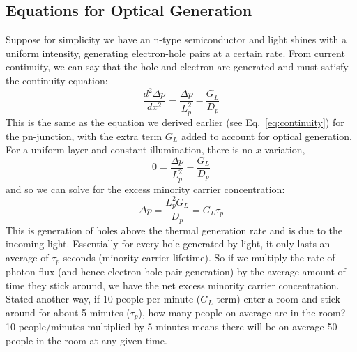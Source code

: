 \subsection{Equations for Optical Generation}
Suppose for simplicity we have an n-type semiconductor and light shines with a uniform intensity, generating electron-hole pairs at a certain rate.   From current continuity, we can say that the hole and electron are generated and must satisfy the continuity equation:
    \begin{equation} 
        \frac{d^2 \Delta p}{dx^2}   = \frac{\Delta p}{L_p^2} - \frac{G_L}{D_p}
    \end{equation}
This is the same as the equation we derived earlier (see Eq.~\ref{eq:continuity}) for the pn-junction, with the extra term $G_L$ added to account for optical generation.   For a uniform layer and constant illumination, there is no $x$ variation, 
    \begin{equation} 
        0  = \frac{\Delta p}{L_p^2} - \frac{G_L}{D_p}
    \end{equation}
and so we can solve for the excess minority carrier concentration:
    \begin{equation} 
        \Delta p = \frac{L_p^2 G_L}{D_p} = G_L \tau_p
    \end{equation}
This is generation of holes above the thermal generation rate and is due to the incoming light.  Essentially for every hole generated by light, it only lasts an average of $\tau_p$ seconds (minority carrier lifetime).  So if we multiply the rate of photon flux (and hence electron-hole pair generation) by the average amount of time they stick around, we have the net excess minority carrier concentration.   Stated another way, if 10 people per minute ($G_L$ term) enter a room and stick around for about 5 minutes ($\tau_p$), how many people on average are in the room?   10 people/minutes multiplied by 5 minutes means there will be on average 50 people in the room at any given time.  
